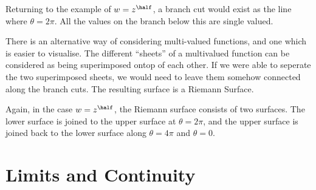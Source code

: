 \begin{example}
  Returning to the example of $w = z^{\half}$, a branch cut would
  exist as the line where $\theta = 2 \pi$. All the values on the
  branch below this are single valued.
\end{example}
There is an alternative way of considering multi-valued functions, and
one which is easier to visualise. The different ``sheets'' of a
multivalued function can be considered as being superimposed ontop of
each other. If we were able to seperate the two superimposed sheets,
we would need to leave them somehow connected along the branch
cuts. The resulting surface is a Riemann Surface.
\begin{example}
  Again, in the case $w = z^{\half}$, the Riemann surface consists of
  two surfaces. The lower surface is joined to the upper surface at
  $\theta=2 \pi$, and the upper surface is joined back to the lower
  surface along $\theta=4 \pi$ and $\theta=0$.
\end{example}

\section{Limits and Continuity}
\label{sec:limits}

